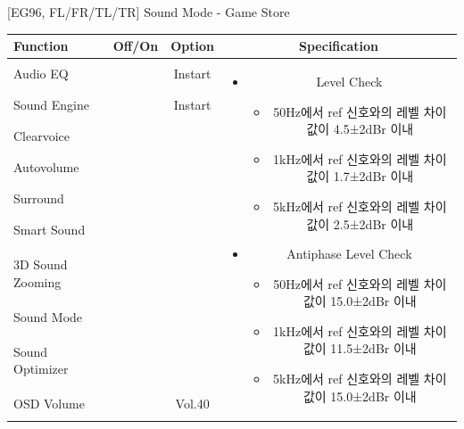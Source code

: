 \documentclass{beamer}
\begin{document}
\begin{frame}[t]{[EG96, FL/FR/TL/TR] Sound Mode - Game Store}
\begin{tiny}
\begin{tabular}{@{}lccc@{}}
\toprule
Function & Off/On & Option & Specification \\
\midrule
Audio EQ & \color{black}{Off} & Instart &
\multirow{10}{60mm}{
\begin{itemize}
\item Level Check
  \begin{itemize}
  \item 50Hz에서 ref 신호와의 레벨 차이값이 4.5±2dBr 이내
  \item 1kHz에서 ref 신호와의 레벨 차이값이 1.7±2dBr 이내
  \item 5kHz에서 ref 신호와의 레벨 차이값이 2.5±2dBr 이내
  \end{itemize}
\item Antiphase Level Check
  \begin{itemize}
  \item 50Hz에서 ref 신호와의 레벨 차이값이 15.0±2dBr 이내
  \item 1kHz에서 ref 신호와의 레벨 차이값이 11.5±2dBr 이내
  \item 5kHz에서 ref 신호와의 레벨 차이값이 15.0±2dBr 이내
  \end{itemize}
\end{itemize}
} \\
Sound Engine & \color{blue}{On} & Instart & \\
Clearvoice & \color{black}{Off} & & \\
Autovolume & \color{black}{Off} & & \\
Surround & \color{black}{Off} & & \\
Smart Sound & \color{black}{Off} & & \\
3D Sound Zooming & \color{black}{Off} & & \\
Sound Mode & \color{blue}{On} & \color{blue}{Game} & \\
Sound Optimizer & \color{black}{Off} & & \\
OSD Volume & \color{blue}{On} & Vol.40 & \\
\midrule
\end{tabular}
\end{tiny}

\end{frame}
\end{document}
